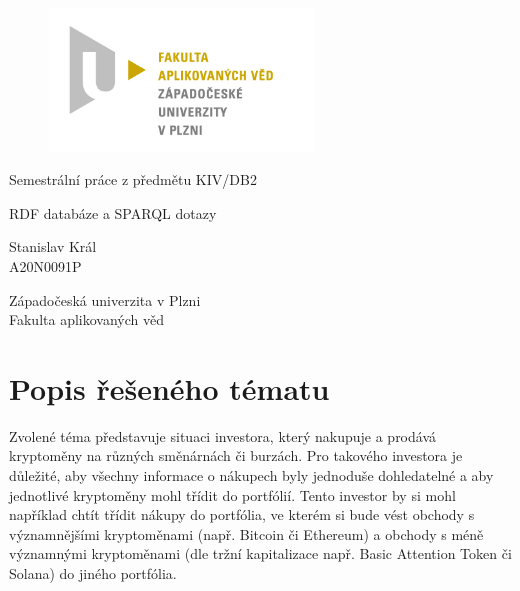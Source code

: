 \documentclass[12pt, a4paper]{article}
\let\oldsection\section
\renewcommand\section{\clearpage\oldsection}
\begin{document}
	\renewcommand{\lstlistingname}{Ukázka kódu}
	\renewcommand{\lstlistlistingname}{Seznam ukázek kódu}
    \begin{titlepage}

        \centering

        \vspace*{\baselineskip}
        \begin{figure}[H]
        \centering
        \includegraphics[width=7cm]{img/fav-logo.jpg}
        \end{figure}

        \vspace*{1\baselineskip}

        \vspace{0.75\baselineskip}

        \vspace{0.5\baselineskip}
        {Semestrální práce z předmětu KIV/DB2}

        {\LARGE\sc RDF databáze a SPARQL dotazy\\}

        \vspace{4\baselineskip}

        \vspace{0.5\baselineskip}

        {\sc\Large Stanislav Král \\}
        \vspace{0.5\baselineskip}
        {A20N0091P}

        \vfill

        {\sc Západočeská univerzita v Plzni\\
        Fakulta aplikovaných věd}

    \end{titlepage}


    \tableofcontents
    \pagebreak

    
\section{Popis řešeného tématu}
Zvolené téma představuje situaci investora, který nakupuje a prodává kryptoměny na různých směnárnách či burzách. Pro takového investora je důležité, aby všechny informace o nákupech byly jednoduše dohledatelné a aby jednotlivé kryptoměny mohl třídit do portfólií. Tento investor by si mohl například chtít třídit nákupy do portfólia, ve kterém si bude vést obchody s významnějšími kryptoměnami (např. Bitcoin či Ethereum) a obchody s méně významnými kryptoměnami (dle tržní kapitalizace např. Basic Attention Token či Solana) do jiného portfólia.
    
\end{document}
